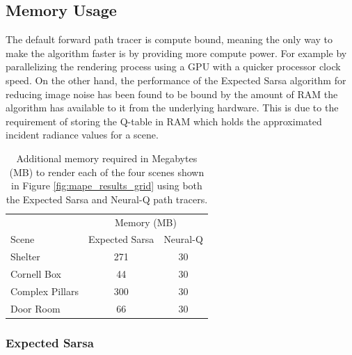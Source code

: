 \documentclass[../dissertation.tex]{subfiles}
\begin{document}
\subsection{Memory Usage}

The default forward path tracer is compute bound, meaning the only way to make the algorithm faster is by providing more compute power. For example by parallelizing the rendering process using a GPU with a quicker processor clock speed. On the other hand, the performance of the Expected Sarsa algorithm for reducing image noise has been found to be bound by the amount of RAM the algorithm has available to it from the  underlying hardware. This is due to the requirement of storing the Q-table in RAM which holds the approximated incident radiance values for a scene.\\

\begin{table}[h]
	\centering
	\begin{tabular}{lcc}
		\toprule
		& \multicolumn{2}{c}{Memory (MB)} \\ \cmidrule(lr){2-3}
		Scene & Expected Sarsa & Neural-Q \\
		\midrule
		Shelter & 271 & 30 \\
		Cornell Box & 44 & 30 \\
		Complex Pillars & 300 & 30 \\
		Door Room & 66 & 30 \\
		\bottomrule
	\end{tabular}
	\caption{Additional memory required in Megabytes (MB) to render each of the four scenes shown in Figure \ref{fig:mape_results_grid} using both the Expected Sarsa and Neural-Q path tracers.}
	\label{tab:memory_usage}
\end{table}

\subsubsection{Expected Sarsa}
\end{document}
